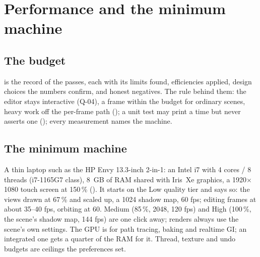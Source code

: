 \chapter{Performance and the minimum machine}
\label{ch:performance}

\section{The budget}
 is the record of the passes, each with its limits found, efficiencies applied, design
choices the numbers confirm, and honest negatives. The rule behind them: the editor stays interactive (Q-04), a frame
within the budget for ordinary scenes, heavy work off the per-frame path (); a unit test may print a time but
never asserts one (); every measurement names the machine.

\section{The minimum machine}
A thin laptop such as the HP Envy 13.3-inch 2-in-1: an Intel i7 with 4 cores / 8 threads (i7-1165G7 class), 8~GB of
RAM shared with Iris~Xe graphics, a 1920$\times$1080 touch screen at 150\,\% (). It starts on the Low quality
tier and says so: the views drawn at 67\,\% and scaled up, a 1024 shadow map, 60 fps; editing frames at about 35--40
fps, orbiting at 60. Medium (85\,\%, 2048, 120 fps) and High (100\,\%, the scene's shadow map, 144 fps) are one click
away; renders always use the scene's own settings. The GPU is for path tracing, baking and realtime GI; an integrated
one gets a quarter of the RAM for it. Thread, texture and undo budgets are ceilings the preferences set.

